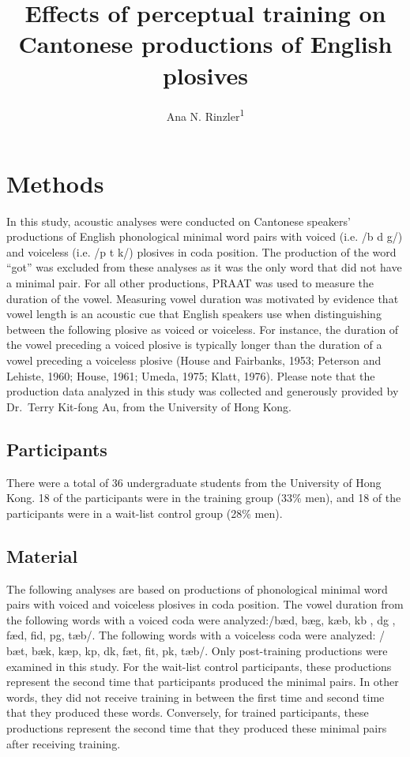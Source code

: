 \documentclass[man]{apa6}
\title{Effects of perceptual training on Cantonese productions of English
plosives}
\author{Ana N. Rinzler\textsuperscript{1}}
\affiliation{
    \vspace{0.5cm}
          \textsuperscript{1} Rutgers University, the State University of New Jersey\\
          \textsuperscript{}   }
\theoremstyle{definition}
\theoremstyle{definition}
\theoremstyle{definition}
\theoremstyle{remark}
\begin{document}
\maketitle

\setcounter{secnumdepth}{0}



\section{Methods}\label{methods}

In this study, acoustic analyses were conducted on Cantonese speakers'
productions of English phonological minimal word pairs with voiced (i.e.
/b d g/) and voiceless (i.e. /p t k/) plosives in coda position. The
production of the word \enquote{got} was excluded from these analyses as
it was the only word that did not have a minimal pair. For all other
productions, PRAAT was used to measure the duration of the vowel.
Measuring vowel duration was motivated by evidence that vowel length is
an acoustic cue that English speakers use when distinguishing between
the following plosive as voiced or voiceless. For instance, the duration
of the vowel preceding a voiced plosive is typically longer than the
duration of a vowel preceding a voiceless plosive (House and Fairbanks,
1953; Peterson and Lehiste, 1960; House, 1961; Umeda, 1975; Klatt,
1976). Please note that the production data analyzed in this study was
collected and generously provided by Dr.~Terry Kit-fong Au, from the
University of Hong Kong.

\subsection{Participants}\label{participants}

There were a total of 36 undergraduate students from the University of
Hong Kong. 18 of the participants were in the training group (33\% men),
and 18 of the participants were in a wait-list control group (28\% men).

\subsection{Material}\label{material}

The following analyses are based on productions of phonological minimal
word pairs with voiced and voiceless plosives in coda position. The
vowel duration from the following words with a voiced coda were
analyzed:/b\ae d, bæg, k\ae b, k\textturnv b , d\textopeno g , f\ae d,
fid, p\textsci g, t\ae b/. The following words with a voiceless coda
were analyzed: / b\ae t, b\ae k, k\ae p, k\textturnv p, d\textscripta k,
f\ae t, fit, p\textsci k, t\ae b/. Only post-training productions were
examined in this study. For the wait-list control participants, these
productions represent the second time that participants produced the
minimal pairs. In other words, they did not receive training in between
the first time and second time that they produced these words.
Conversely, for trained participants, these productions represent the
second time that they produced these minimal pairs after receiving
training.
\end{document}
